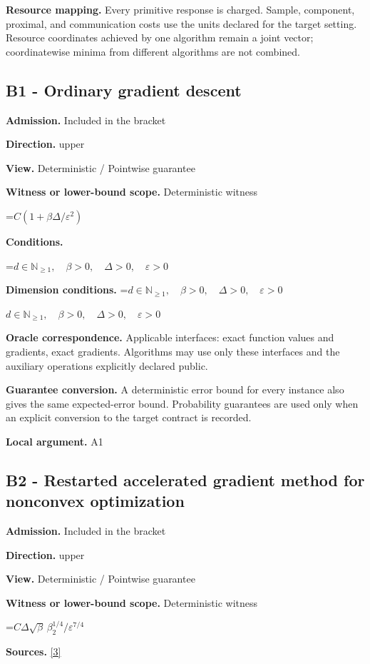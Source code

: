 \documentclass[10pt,a4paper]{article}
\newcommand{\AtlasMath}[1]{\par\begingroup\centering\setbox0=\hbox{$\displaystyle #1$}\ifdim\wd0>1.4\linewidth\typeout{ATLAS WIDE FORMULA: \the\wd0}\fi\ifdim\wd0>\linewidth\resizebox{\linewidth}{!}{\box0}\else\box0\fi\par\endgroup}
\newcommand{\AtlasInlineMath}[1]{\begingroup\setbox0=\hbox{$#1$}\ifdim\wd0>.4\linewidth\endgroup\AtlasMath{#1}\else\endgroup$#1$\fi}
\begin{document}
\textbf{Resource mapping.} Every primitive response is charged. Sample, component, proximal, and communication costs use the units declared for the target setting. Resource coordinates achieved by one algorithm remain a joint vector; coordinatewise minima from different algorithms are not combined.

\subsection{B1 - Ordinary gradient descent}
\textbf{Admission.} Included in the bracket

\textbf{Direction.} upper

\textbf{View.} Deterministic / Pointwise guarantee

\textbf{Witness or lower-bound scope.} Deterministic witness

\AtlasMath{C(1+\beta\Delta/\varepsilon^2)}
\textbf{Conditions.} 
\AtlasMath{d\in\mathbb{N}_{\ge1},\quad \beta>0,\quad \Delta>0,\quad \varepsilon>0}


\textbf{Dimension conditions.} \AtlasInlineMath{d\in\mathbb{N}_{\ge1},\quad \beta>0,\quad \Delta>0,\quad \varepsilon>0}

\textbf{Oracle correspondence.} Applicable interfaces: exact function values and gradients, exact gradients. Algorithms may use only these interfaces and the auxiliary operations explicitly declared public.

\textbf{Guarantee conversion.} A deterministic error bound for every instance also gives the same expected-error bound. Probability guarantees are used only when an explicit conversion to the target contract is recorded.

\textbf{Local argument.} A1

\subsection{B2 - Restarted accelerated gradient method for nonconvex optimization}
\textbf{Admission.} Included in the bracket

\textbf{Direction.} upper

\textbf{View.} Deterministic / Pointwise guarantee

\textbf{Witness or lower-bound scope.} Deterministic witness

\AtlasMath{C\Delta\sqrt\beta\,\beta_2^{1/4}/\varepsilon^{7/4}}
\textbf{Sources.} \href{https://jmlr.org/papers/volume24/22-0522/22-0522.pdf}{[3]}
\end{document}

